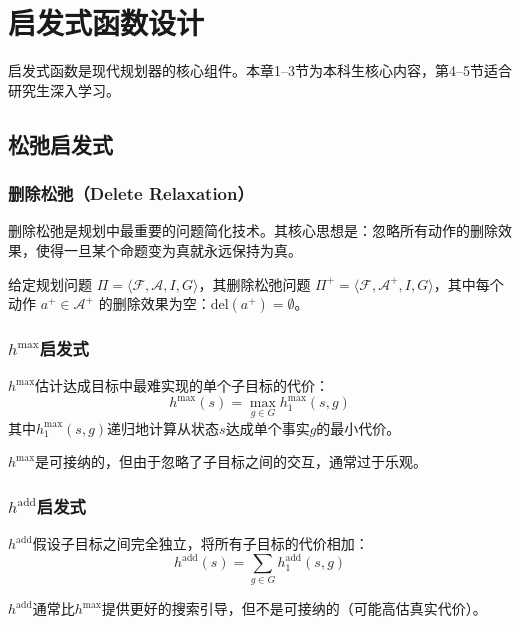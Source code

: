 \chapter{启发式函数设计 \ug}

\begin{levelbox}
启发式函数是现代规划器的核心组件。本章1--3节为本科生核心内容，第4--5节适合研究生深入学习。
\end{levelbox}

\section{松弛启发式 \ug}

\subsection{删除松弛（Delete Relaxation）}

删除松弛是规划中最重要的问题简化技术。其核心思想是：忽略所有动作的删除效果，使得一旦某个命题变为真就永远保持为真。

\begin{definition}[删除松弛问题]
给定规划问题 $\Pi = \langle \mathcal{F}, \mathcal{A}, I, G \rangle$，其删除松弛问题 $\Pi^+ = \langle \mathcal{F}, \mathcal{A}^+, I, G \rangle$，其中每个动作 $a^+ \in \mathcal{A}^+$ 的删除效果为空：$\mathrm{del}(a^+) = \emptyset$。
\end{definition}

\subsection{$h^{\max}$启发式}

$h^{\max}$估计达成目标中最难实现的单个子目标的代价：
$$h^{\max}(s) = \max_{g \in G} h^{\max}_1(s, g)$$
其中$h^{\max}_1(s, g)$递归地计算从状态$s$达成单个事实$g$的最小代价。

$h^{\max}$是可接纳的，但由于忽略了子目标之间的交互，通常过于乐观。

\subsection{$h^{\mathrm{add}}$启发式}

$h^{\mathrm{add}}$假设子目标之间完全独立，将所有子目标的代价相加：
$$h^{\mathrm{add}}(s) = \sum_{g \in G} h^{\mathrm{add}}_1(s, g)$$

$h^{\mathrm{add}}$通常比$h^{\max}$提供更好的搜索引导，但不是可接纳的（可能高估真实代价）。

